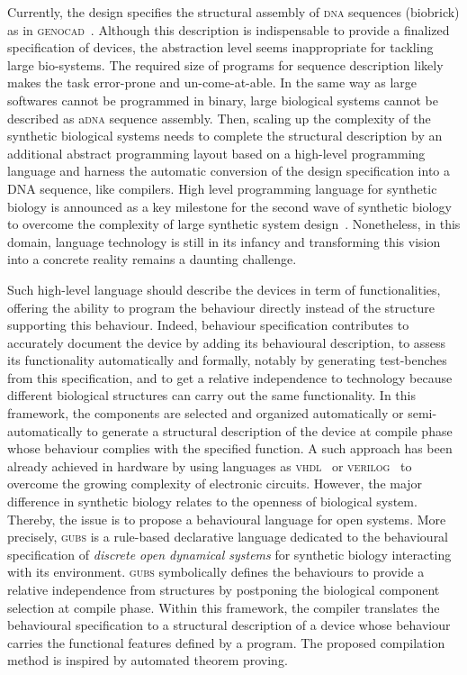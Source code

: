\documentclass{eptcs}
\newcounter{ti}
\begin{document}
Currently, the design specifies the structural assembly of \textsc{dna} sequences (biobrick) as in \textsc{genocad}~\cite{Cai2009}. Although this description is indispensable to provide a finalized specification of devices, the abstraction level seems inappropriate for tackling large bio-systems. The required size of programs for sequence description likely makes the task error-prone and un-come-at-able. In the same way as large softwares cannot be programmed in binary, large biological systems cannot be described as a\textsc{dna} sequence assembly. Then, scaling up the complexity of the synthetic biological systems needs to complete the structural description by an additional abstract programming layout based on a high-level programming language and harness the automatic conversion of the design specification into a DNA sequence, like compilers. High level programming language for synthetic biology is announced as a key milestone for the second wave of synthetic biology to overcome the complexity of large synthetic system design~\cite{Purnick2009}. Nonetheless, in this domain, language technology is still in its infancy and transforming this vision into a concrete reality remains a daunting challenge. 

Such high-level language should describe the devices in term of functionalities, offering the ability to program the behaviour directly instead of the structure supporting this behaviour.
Indeed, behaviour specification contributes to accurately document the device by adding its behavioural description, to assess its functionality automatically and formally, notably by generating test-benches from this specification, and to get a relative independence to technology because different biological structures can carry out the same functionality. In this framework, the components are selected and organized automatically or semi-automatically to generate a structural description of the device at compile phase whose behaviour complies with the specified function.
A such approach has been already achieved in hardware by using languages as \textsc{vhdl}~\cite{Ashenden2002} or \textsc{verilog}~\cite{Thomas1998} to overcome the growing complexity of electronic circuits. However, the major difference in synthetic biology relates to the openness of biological system. Thereby, the issue is to propose a behavioural language for open systems.
More precisely, \textsc{gubs} is a rule-based declarative language dedicated to the behavioural specification of \emph{discrete open dynamical systems }for synthetic biology interacting with its environment. \textsc{gubs} symbolically defines
the behaviours to provide a relative independence from structures by postponing the biological component selection at compile phase. Within this framework, the compiler translates the behavioural specification to a structural description of a device whose behaviour carries the functional features defined by a program. The proposed compilation method is inspired by automated theorem proving. 
\end{document}
